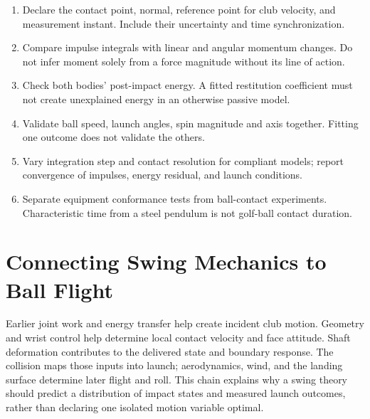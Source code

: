 \begin{enumerate}
\item Declare the contact point, normal, reference point for club velocity,
and measurement instant. Include their uncertainty and time synchronization.
\item Compare impulse integrals with linear and angular momentum changes.
Do not infer moment solely from a force magnitude without its line of action.
\item Check both bodies' post-impact energy. A fitted restitution coefficient
must not create unexplained energy in an otherwise passive model.
\item Validate ball speed, launch angles, spin magnitude and axis together.
Fitting one outcome does not validate the others.
\item Vary integration step and contact resolution for compliant models;
report convergence of impulses, energy residual, and launch conditions.
\item Separate equipment conformance tests from ball-contact experiments.
Characteristic time from a steel pendulum is not golf-ball contact duration.
\end{enumerate}

\section{Connecting Swing Mechanics to Ball Flight}

Earlier joint work and energy transfer help create incident club motion.
Geometry and wrist control help determine local contact velocity and face
attitude. Shaft deformation contributes to the delivered state and boundary
response. The collision maps those inputs into launch; aerodynamics, wind,
and the landing surface determine later flight and roll. This chain explains
why a swing theory should predict a distribution of impact states and measured
launch outcomes, rather than declaring one isolated motion variable optimal.

